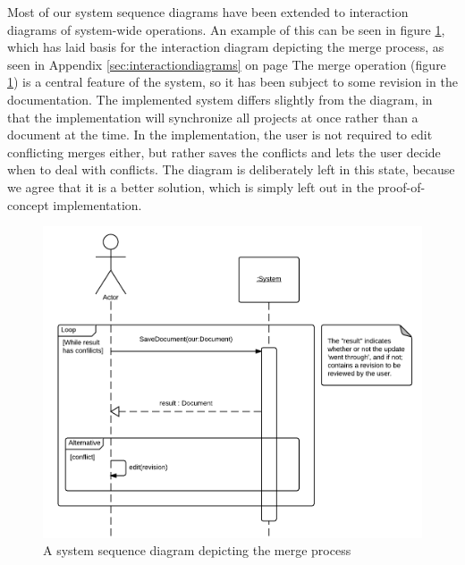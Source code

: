 Most of our system sequence diagrams have been extended to interaction diagrams of system-wide operations. 
An example of this can be seen in figure \ref{fig:merge-ssd}, 
which has laid basis for the interaction diagram depicting the merge process, 
as seen in Appendix \ref{sec:interactiondiagrams} on page \pageref{fig:interaction-merge-diagram}
The merge operation (figure \ref{fig:merge-ssd}) is a central feature of the \SOP{} 
system, so it has been subject to some revision in the documentation.
The implemented system differs slightly from the diagram, in that the implementation will synchronize all projects at once rather than a document at the time. 
In the implementation, the user is not required to edit conflicting merges either, but rather 
saves the conflicts and lets the user decide when to deal with conflicts.
The diagram is deliberately left in this state, because we agree that it is a better solution, which is simply left out in the proof-of-concept \SOP{} implementation.

\begin{figure}[hbt]
	\centering
	\includegraphics[width=1\textwidth]{Software_analysis/graphics/Merge-ssd.png}
	\caption{A system sequence diagram depicting the merge process}
	\label{fig:merge-ssd}
\end{figure}
